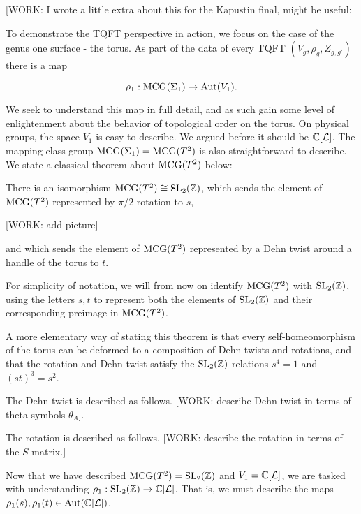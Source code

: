 [WORK: I wrote a little extra about this for the Kapustin final, might be useful:

To demonstrate the TQFT perspective in action, we focus on the case of the genus one surface - the torus. As part of the data of every TQFT $(V_g, \rho_g, Z_{g,g'})$ there is a map

$$\rho_1:\operatorname{MCG}(\Sigma_1)\to \operatorname{Aut}(V_1).$$

We seek to understand this map in full detail, and as such gain some level of enlightenment about the behavior of topological order on the torus. On physical groups, the space $V_1$ is easy to describe. We argued before it should be $\mathbb{C}[\mathcal{L}]$. The mapping class group $\operatorname{MCG}(\Sigma_1)=\operatorname{MCG}(T^2)$ is also straightforward to describe. We state a classical theorem about $\operatorname{MCG}(T^2)$ below:

\begin{theorem} There is an isomorphism $\operatorname{MCG}(T^2)\cong \operatorname{SL}_2(\mathbb{Z})$, which sends the element of $\operatorname{MCG}(T^2)$ represented by $\pi/2$-rotation to $s$,

[WORK: add picture]

and which sends the element of $\operatorname{MCG}(T^2)$ represented by a Dehn twist around a handle of the torus to $t$. 
\end{theorem}
\begin{remark} For simplicity of notation, we will from now on identify $\operatorname{MCG}(T^2)$ with $\operatorname{SL}_2(\mathbb{Z})$, using the letters $s,t$ to represent both the elements of $\operatorname{SL}_2(\mathbb{Z})$ and their corresponding preimage in $\operatorname{MCG}(T^2)$.

A more elementary way of stating this theorem is that every self-homeomorphism of the torus can be deformed to a composition of Dehn twists and rotations, and that the rotation and Dehn twist satisfy the $\operatorname{SL}_2(\mathbb{Z})$ relations $s^4=1$ and $(st)^3=s^2$.

The Dehn twist is described as follows. [WORK: describe Dehn twist in terms of theta-symbols $\theta_{A}$].

The rotation is described as follows. [WORK: describe the rotation in terms of the $S$-matrix.]



\end{remark}

Now that we have described $\operatorname{MCG}(T^2)=\operatorname{SL}_2(\mathbb{Z})$ and $V_1=\mathbb{C}[\mathcal{L}]$, we are tasked with understanding $\rho_1:\operatorname{SL}_2(\mathbb{Z})\to \mathbb{C}[\mathcal{L}]$. That is, we must describe the maps $\rho_1(s),\rho_1(t)\in \operatorname{Aut}(\mathbb{C}[\mathcal{L}])$.



